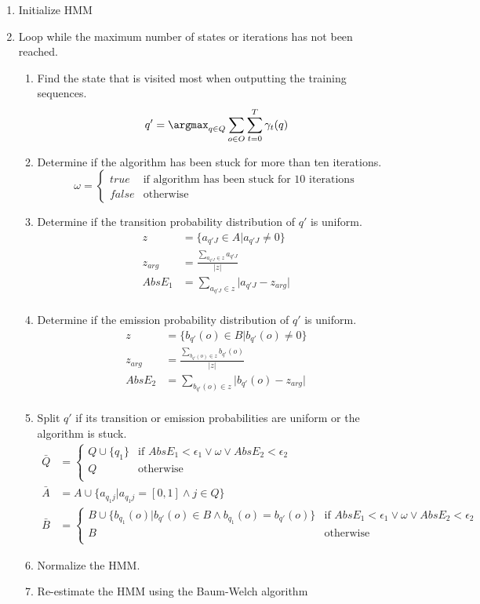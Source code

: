 \begin{enumerate}
\item Initialize HMM
\item Loop while the maximum number of states or iterations has not been reached.
\indent \begin{enumerate}
	\item 	Find the state that is visited most when outputting the training sequences.
	$$q' = \argmax_{q \in Q}\sum_{o \in O}\sum_{t=0}^{T}\gamma_t(q)$$ 
	\item Determine if the algorithm has been stuck for more than ten iterations.
	$$ \omega = \begin{cases}
		true &\text{if algorithm has been stuck for 10 iterations} \\
		false &\text{otherwise}
	\end{cases} $$
	\item Determine if the transition probability distribution of $q'$ is uniform.
	\begin{align*}
	z &= \{a_{q'J} \in A \vert a_{q'J} \neq 0\} \\
	z_{arg} &= \frac{\sum_{a_{q'J} \in z} a_{q'J}}{\vert z \vert} \\
	AbsE_1 &= \sum_{a_{q'J} \in z} \vert a_{q'J} - z_{arg} \vert \\
	\end{align*}
	\item Determine if the emission probability distribution of $q'$ is uniform.
	\begin{align*}
	z &= \{b_{q'}(o) \in B \vert b_{q'}(o) \neq 0\} \\
	z_{arg} &= \frac{\sum_{b_{q'}(o) \in z} b_{q'}(o)}{\vert z \vert} \\
	AbsE_2 &= \sum_{b_{q'}(o) \in z} \vert b_{q'}(o) - z_{arg} \vert \\
	\end{align*}
	\item Split $q'$ if its transition or emission probabilities are uniform or the algorithm is stuck. 
	\begin{align*}
	\bar{Q} &= \begin{cases}
		Q \cup \{ q_1 \} &\text{if } AbsE_1 < \epsilon_1 \vee \omega \vee AbsE_2 < \epsilon_2 \\
		Q	&\text{otherwise} \\
	\end{cases} \\
	\bar{A} &= A \cup \{a_{q_1j} \vert a_{q_1j} = [0,1] \wedge j \in Q \} \\
	\bar{B} &= \begin{cases}
		B \cup \{ b_{q_1}(o) \vert b_{q'}(o) \in B \wedge b_{q_1}(o) = b_{q'}(o)\} 
			&\text{if } AbsE_1 < \epsilon_1 \vee \omega \vee AbsE_2 < \epsilon_2 \\
		B &\text{otherwise} \\
	\end{cases}
	\end{align*}
	\item Normalize the HMM.
	\item Re-estimate the HMM using the Baum-Welch algorithm
\end{enumerate}

\end{enumerate}

